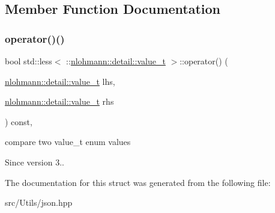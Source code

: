 \subsection{Member Function Documentation}
\mbox{\label{structstd_1_1less_3_01_1_1nlohmann_1_1detail_1_1value__t_01_4_a76d2a6c170cfd74f3b1882be1b5a6671}} 
\subsubsection{\texorpdfstring{operator()()}{operator()()}}
{\footnotesize\ttfamily bool std\+::less$<$ \+::\mbox{\hyperlink{namespacenlohmann_1_1detail_a90aa5ef615aa8305e9ea20d8a947980f}{nlohmann\+::detail\+::value\+\_\+t}} $>$\+::operator() (\begin{DoxyParamCaption}\item[{\mbox{\hyperlink{namespacenlohmann_1_1detail_a90aa5ef615aa8305e9ea20d8a947980f}{nlohmann\+::detail\+::value\+\_\+t}}}]{lhs,  }\item[{\mbox{\hyperlink{namespacenlohmann_1_1detail_a90aa5ef615aa8305e9ea20d8a947980f}{nlohmann\+::detail\+::value\+\_\+t}}}]{rhs }\end{DoxyParamCaption}) const\hspace{0.3cm}{\ttfamily [inline]}, {\ttfamily [noexcept]}}



compare two value\+\_\+t enum values 

\begin{DoxySince}{Since}
version 3.. 
\end{DoxySince}


The documentation for this struct was generated from the following file\+:\begin{DoxyCompactItemize}
\item 
src/\+Utils/json.\+hpp\end{DoxyCompactItemize}
